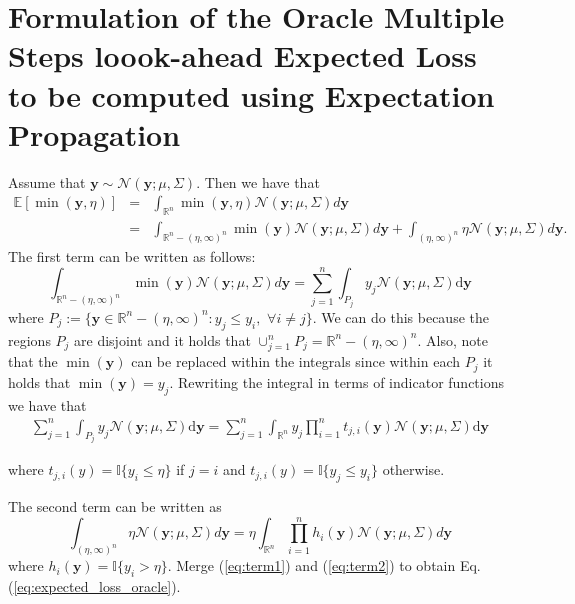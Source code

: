 \documentclass[twoside]{article}
\newcommand{\ud}{\mathrm{d}}
\newcommand{\E}{\mathbb{E}}
\newcommand{\by}{\textbf{y}}
\newcommand{\N}{\mathcal{N}}
\newcommand{\IR}{\mathbb{R}}
\begin{document}
\section{Formulation of the Oracle Multiple Steps loook-ahead Expected Loss to be computed using Expectation Propagation}
Assume that $\by \sim \N(\by; \mu, \Sigma)$. Then we have that
\begin{eqnarray}\nonumber
\E[\min (\by,\eta)] & = & \int_{\IR^n} \min (\by,\eta)  \N(\by; \mu, \Sigma) d\by\\ \nonumber
& = & \int_{\IR^n - (\eta,\infty)^n } \min (\by)  \N(\by; \mu, \Sigma) d\by + \int_{(\eta,\infty)^n} \eta  \N(\by; \mu, \Sigma) d\by.  \nonumber
\end{eqnarray}
The first term can be written as follows:
\begin{equation}
 \int_{\IR^n - (\eta,\infty)^n } \min (\by)  \N(\by; \mu, \Sigma) d\by  =    \sum_{j=1}^n \int_{P_j} y_j \N(\by; \mu, \Sigma) \ud \by \nonumber
\end{equation}\nonumber
where $P_j := \{ \by \in\IR^n - (\eta,\infty)^n  : y_j \leq y_i,\,\, \forall i \neq j \}$. We can do this because the regions $P_j$ are disjoint and it holds that $\cup_{j=1}^{n}P_j = \IR^n - (\eta,\infty)^n $.  Also, note that the $\min(\by)$ can be replaced within the integrals since within each $P_j$ it holds that $\min(\by) = y_j$. Rewriting the integral in terms of indicator functions we have that
\begin{eqnarray}\label{eq:term1}
 \sum_{j=1}^n \int_{P_j} y_j \N(\by; \mu, \Sigma) \ud \by   =  \sum_{j=1}^n  \int_{\IR^n} y_j \prod_{i=1}^n t_{j,i}(\by) \N(\by; \mu, \Sigma) \ud \by 
\end{eqnarray}

where $t_{j,i}(y) =\mathbb{I}\{y_i \leq\eta\}$ if $j=i$ and $t_{j,i}(y) =\mathbb{I}\{y_j \leq y_i \}$ otherwise.

The second term can be written as
\begin{equation}\label{eq:term2}
 \int_{(\eta,\infty)^n } \eta  \N(\by; \mu, \Sigma) d\by = \eta\int_{\IR^n} \prod_{i=1}^nh_i(\by) \N(\by; \mu, \Sigma) d\by
\end{equation}
where $h_i(\by) = \mathbb{I}\{y_i>\eta\}$.  Merge (\ref{eq:term1}) and (\ref{eq:term2}) to obtain Eq.  (\ref{eq:expected_loss_oracle}).
 
\end{document}
